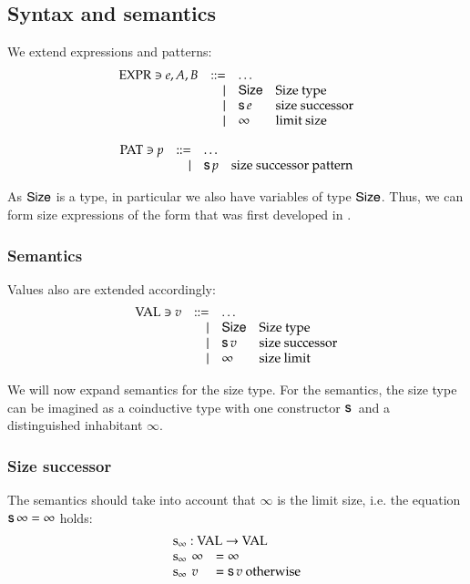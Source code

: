 \subsection{Syntax and semantics}

We extend expressions and patterns:
\[
\begin{array}{lrll}
\operatorname{EXPR} \ni e,A,B & ::= & \ldots & \\
& \mid & \mathsf{Size} & \mbox{Size type} \\
& \mid & \mathsf{s}\, e  & \mbox{size successor}\\ 
& \mid & \infty & \mbox{limit size}\\
\end{array}
\]

\[
\begin{array}{lrll}
\operatorname{PAT} \ni p & ::= & \ldots & \\
& \mid & \mathsf{s}\, p & \mbox{size successor pattern}\\
\end{array}
\]

As $\mathsf{Size}$ is a type, in particular we also have variables of type $\mathsf{Size}$.
Thus, we can form size expressions of the form that was first developed in \cite{g+04:mscs}.


\subsubsection{Semantics}

Values also are extended accordingly:
\[
\begin{array}{lrll}
\operatorname{VAL} \ni v & ::= & \ldots & \\
& \mid & \mathsf{Size} & \mbox{Size type}\\
& \mid & \mathsf{s}\, v & \mbox{size successor}\\
& \mid & \infty & \mbox{size limit}\\
\end{array}
\]

We will now expand semantics for the size type. For the semantics, the size type can be imagined as a coinductive type with one constructor $\mathsf{s}\,$ and a distinguished inhabitant $\infty$.

\subsubsection{Size successor}
The semantics should take into account that $\infty$ is the limit size, i.e. the equation $\mathsf{s}\, \infty = \infty$ holds:
\[
\begin{array}[t]{ll}
\multicolumn{2}{l}{\sinfty : \Val \ra \Val}\\ 
\sinfty \: \infty & = \infty\\
\sinfty \:  v & = \s v  \mbox{ otherwise}\\ 
\end{array}
\]

